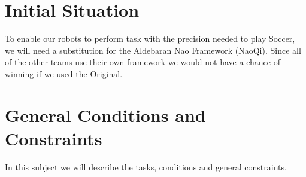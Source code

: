 \documentclass[12pt]{article}
\theoremstyle{definition}
\newenvironment{explanation}{%
   \setlength{\parindent}{0pt}
   \itshape
   \color{blue}
}{}
\begin{document}
\section{Initial Situation}
\begin{explanation}


To enable our robots to perform task with the precision needed to play Soccer, we will need a substitution for the Aldebaran Nao Framework (NaoQi). Since all of the other teams use their own framework we would not have a chance of winning if we used the Original.



\end{explanation}

\pagebreak

\section{General Conditions and Constraints}
\begin{explanation}
In this subject we will describe the tasks, conditions and general constraints. 
\end{explanation}
\end{document}
